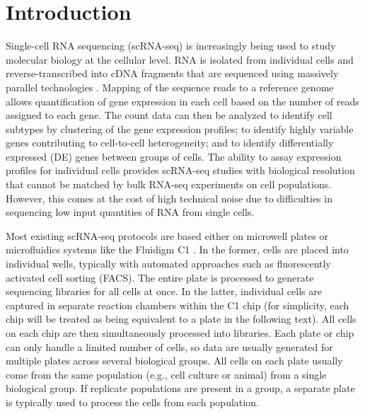 \documentclass[oupdraft]{bio}
\begin{document}
\newcommand{\suppsimulation}{1}
\newcommand{\suppimplementation}{2}
\newcommand{\suppmeanvar}{3}
\newcommand{\supphiddenvar}{4}
\newcommand{\suppnorm}{2.2}

\newcommand{\suppparamsim}{S1}
\newcommand{\suppfailsim}{S2}
\newcommand{\suppokaysim}{S3}
\newcommand{\supppowerroc}{S4}
\newcommand{\supppowerfdr}{S5}
\newcommand{\supprealrank}{S6}
\newcommand{\suppexpprof}{S7}

\section{Introduction}
Single-cell RNA sequencing (scRNA-seq) is increasingly being used to study molecular biology at the cellular level.
RNA is isolated from individual cells and reverse-transcribed into cDNA fragments that are sequenced using massively parallel technologies \citep{stegle2015computational}.
Mapping of the sequence reads to a reference genome allows quantification of gene expression in each cell based on the number of reads assigned to each gene.
The count data can then be analyzed to identify cell subtypes by clustering of the gene expression profiles;
    to identify highly variable genes contributing to cell-to-cell heterogeneity;
    and to identify differentially expressed (DE) genes between groups of cells.
The ability to assay expression profiles for individual cells provides scRNA-seq studies with biological resolution that cannot be matched by bulk RNA-seq experiments on cell populations.
However, this comes at the cost of high technical noise due to difficulties in sequencing low input quantities of RNA from single cells.

Most existing scRNA-seq protocols are based either on microwell plates \citep{picelli2014full} or microfluidics systems like the Fluidigm C1 \citep{pollen2014low}.
In the former, cells are placed into individual wells, typically with automated approaches such as fluorescently activated cell sorting (FACS).
The entire plate is processed to generate sequencing libraries for all cells at once.
In the latter, individual cells are captured in separate reaction chambers within the C1 chip 
    (for simplicity, each chip will be treated as being equivalent to a plate in the following text).
All cells on each chip are then simultaneously processed into libraries.
Each plate or chip can only handle a limited number of cells, so data are usually generated for multiple plates across several biological groups. 
All cells on each plate usually come from the same population (e.g., cell culture or animal) from a single biological group.
If replicate populations are present in a group, a separate plate is typically used to process the cells from each population.
\end{document}
